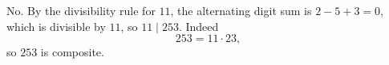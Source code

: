 No. By the divisibility rule for $11$, the alternating digit sum is $2-5+3=0$, which is divisible by $11$, so $11\mid253$. Indeed
\[
253=\boxed{11\cdot23},
\]
so $253$ is composite.

